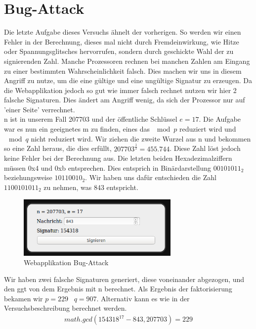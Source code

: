 \documentclass{article}
\begin{document}
\section{Bug-Attack}
Die letzte Aufgabe dieses Versuchs ähnelt der vorherigen. So werden wir einen Fehler in der Berechnung, dieses mal nicht durch Fremdeinwirkung, wie Hitze oder Spannungsglitsches hervorrufen, sondern durch geschickte Wahl der zu signierenden Zahl. Manche Prozessoren rechnen bei manchen Zahlen am Eingang zu einer bestimmten Wahrscheinlichkeit falsch. Dies machen wir uns in diesem Angriff zu nutze, um die eine gültige und eine ungültige Signatur zu erzeugen. Da die Webapplikation jedoch so gut wie immer falsch rechnet nutzen wir hier 2 falsche Signaturen. Dies ändert am Angriff wenig, da sich der Prozessor nur auf 'einer Seite' verrechnet.\\
n ist in unserem Fall 207703 und der öffentliche Schlüssel $e = 17$. Die Aufgabe war es nun ein geeignetes m zu finden, eines das $\mod{p}$ reduziert wird und $\mod{q}$ nicht reduziert wird. Wir ziehen die zweite Wurzel aus n und bekommen so eine Zahl heraus, die dies erfüllt, $207703^{\frac{1}{2}}=455.744$. Diese Zahl löst jedoch keine Fehler bei der Berechnung aus. Die letzten beiden Hexadezimalziffern müssen 0x4 und 0xb entsprechen. Dies entsprich in Binärdarstellung $00101011_2$ beziehungsweise $10110010_2$. Wir haben uns dafür entschieden die Zahl $1100101011_2$ zu nehmen, was 843 entspricht.
\begin{figure}[H]
\centering
\includegraphics[width=0.7\textwidth]{../3_2.png}
\caption{Webapplikation Bug-Attack}
\label{fig:2}
\end{figure}
Wir haben zwei falsche Signaturen generiert, diese voneinander abgezogen, und den ggt von dem Ergebnis mit n berechnet. Als Ergebnis der faktorisierung bekamen wir $p = 229 \;\;\; q = 907$. Alternativ kann es wie in der Versuchsbeschreibung berechnet werden. 
\begin{align}
math.gcd(154318^{17}-843,207703) = 229
\end{align}
\newpage
\end{document}
